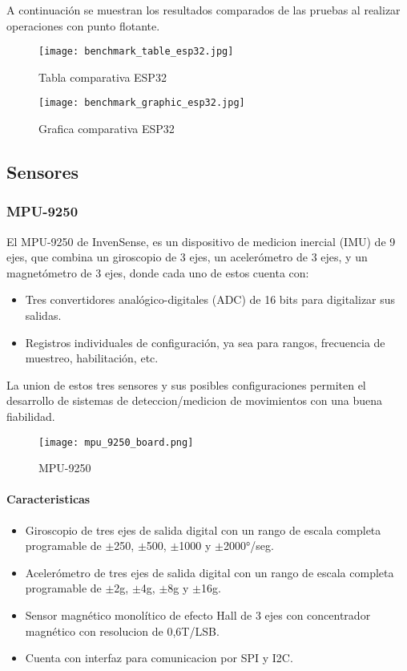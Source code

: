 A continuación se muestran los resultados comparados de las pruebas al realizar operaciones con punto flotante.
\begin{figure}[htp!]
    \centering
    \texttt{[image: benchmark\_table\_esp32.jpg]}
    \caption{Tabla comparativa ESP32}
    \label{fig: table_benchmark}
\end{figure}
\FloatBarrier

\begin{figure}[htp!]
    \centering
    \texttt{[image: benchmark\_graphic\_esp32.jpg]}
    \caption{Grafica comparativa ESP32}
    \label{fig: graphic_benchmark}
\end{figure}
\FloatBarrier

\subsection{Sensores}
\subsubsection{MPU-9250}
El MPU-9250 de InvenSense, es un dispositivo de medicion inercial (IMU) de 9 ejes, que combina
un giroscopio de 3 ejes, un acelerómetro de 3 ejes, y un magnetómetro de 3 ejes, donde cada
uno de estos cuenta con:
\begin{itemize}
    \item Tres convertidores analógico-digitales (ADC) de 16 bits para digitalizar sus salidas.
    \item Registros individuales de configuración, ya sea para rangos, frecuencia de muestreo, habilitación, etc.
\end{itemize}

La union de estos tres sensores y sus posibles configuraciones permiten el desarrollo de sistemas de deteccion/medicion de
movimientos con una buena fiabilidad.

\begin{figure}[htp]
    \centering
    \texttt{[image: mpu\_9250\_board.png]}
    \caption{MPU-9250 }
\end{figure}

\paragraph{Caracteristicas}
\begin{itemize}
    \item Giroscopio de tres ejes de salida digital con un rango de escala completa programable de $ \pm $250, $ \pm $500, $ \pm $1000 y $ \pm $2000°/seg.
    \item Acelerómetro de tres ejes de salida digital con un rango de escala completa programable de $ \pm $2g, $ \pm $4g, $ \pm $8g y $ \pm $16g.
    \item Sensor magnético monolítico de efecto Hall de 3 ejes con concentrador magnético con resolucion de 0,6T/LSB.
    \item Cuenta con interfaz para comunicacion por SPI y I2C.
\end{itemize}

